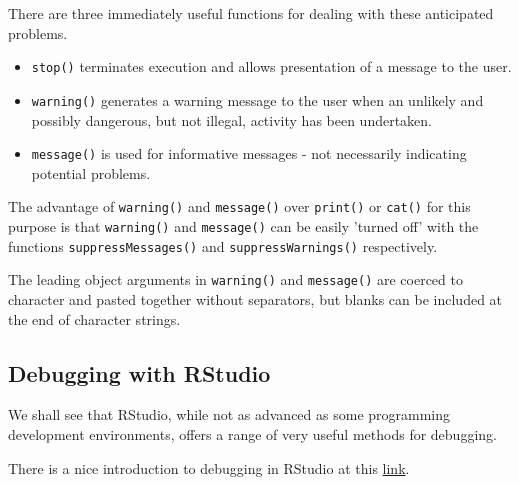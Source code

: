 \documentclass[titlepage]{book}\usepackage{knitr}
\begin{document}
There are three immediately useful functions for dealing with these anticipated problems.
\begin{itemize}
\item{\texttt{stop()} terminates execution and allows presentation of a message to the user.}
\item{\texttt{warning()}   generates a warning message to the user when an unlikely and possibly dangerous, but not illegal, activity has been undertaken.}
\item{\texttt{message()} is used for informative messages - not necessarily indicating potential problems.}
\end{itemize}
The advantage of \texttt{warning()} and \texttt{message()} over \texttt{print()} or \texttt{cat()} for this purpose is that \texttt{warning()} and \texttt{message()} can be easily 'turned off' with the functions \texttt{suppressMessages()} and \texttt{suppressWarnings()} respectively.

The leading object arguments in \texttt{warning()} and \texttt{message()} are coerced to character and pasted together without separators, but blanks can be included at the end of character strings.

\begin{knitrout}
\color{fgcolor}\begin{kframe}
\begin{alltt}
 \hlkwb{<-} 
\hlstd{(}\hlstd{,} \hlopt{<} \hlstd{)}
\hlstd{(}\hlstd{,} \hlopt{<} \hlstd{)}
\end{alltt}
\end{kframe}
\end{knitrout}



\subsection{Debugging with RStudio}

We shall see that RStudio, while not as advanced as some programming development environments, offers a range of very useful methods for debugging.

There is a nice introduction to debugging in RStudio at this \href{https://support.rstudio.com/hc/en-us/articles/205612627-Debugging-with-RStudio#introduction}{link}.
\end{document}
